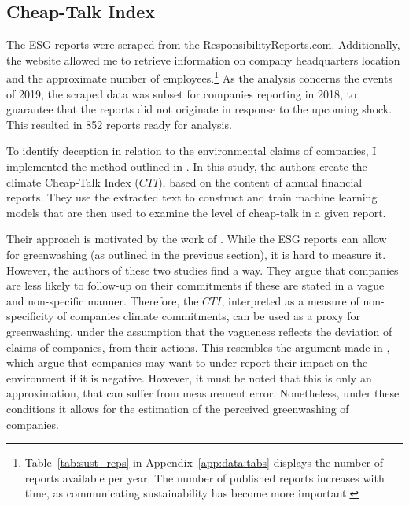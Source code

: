 \documentclass[12pt]{article}
\begin{document}
\subsection{Cheap-Talk Index}

The ESG reports were scraped from the \href{https://responsibilityreports.com}{ResponsibilityReports.com}. Additionally, the website allowed me to retrieve information on company headquarters location and the approximate number of employees.\footnote{Table~\ref{tab:sust_reps} in Appendix~\ref{app:data:tabs} displays the number of reports available per year. The number of published reports increases with time, as communicating sustainability has become more important.} As the analysis concerns the events of 2019, the scraped data was subset for companies reporting in 2018, to guarantee that the reports did not originate in response to the upcoming shock. This resulted in 852 reports ready for analysis. 

To identify deception in relation to the environmental claims of companies, I implemented the method outlined in \textcite{binglerHowCheapTalk2024}. In this study, the authors create the climate Cheap-Talk Index ($CTI$), based on the content of annual financial reports. They use the extracted text to construct and train machine learning models that are then used to examine the level of cheap-talk in a given report. 

Their approach is motivated by the work of \textcite{coenAreCorporateClimate2022, ramusWhenAreCorporate2005}. While the ESG reports can allow for greenwashing (as outlined in the previous section), it is hard to measure it. However, the authors of these two studies find a way. They argue that companies are less likely to follow-up on their commitments if these are stated in a vague and non-specific manner. Therefore, the $CTI$, interpreted as a measure of non-specificity of companies climate commitments, can be used as a proxy for greenwashing, under the assumption that the vagueness reflects the deviation of claims of companies, from their actions. This resembles the argument made in \textcite{binglerCheapTalkCherrypicking2022,marquisScrutinyNormsSelective2016}, which argue that companies may want to under-report their impact on the environment if it is negative. However, it must be noted that this is only an approximation, that can suffer from measurement error. Nonetheless, under these conditions it allows for the estimation of the perceived greenwashing of companies. 
\end{document}
